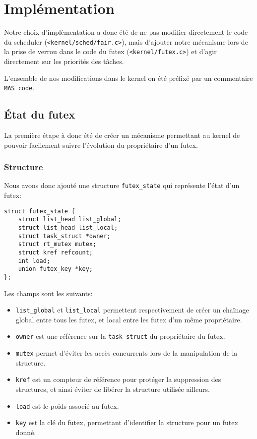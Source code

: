 \section{Implémentation}

Notre choix d'implémentation a donc été de ne pas modifier directement le code du scheduler (\verb|<kernel/sched/fair.c>|), mais d'ajouter notre mécanisme lors de la prise de
verrou dans le code
du futex (\verb|<kernel/futex.c>|) et d'agir directement sur les priorités des tâches.

L'ensemble de nos modifications dans le kernel on été préfixé par un commentaire \verb|MAS code|.

\subsection{État du futex}

La première étape à donc été de créer un mécanisme permettant au kernel de pouvoir facilement
suivre l'évolution du propriétaire d'un futex.

\subsubsection{Structure}

Nous avons donc ajouté une structure \verb|futex_state| qui représente l'état d'un
futex:

\begin{lstlisting}[tabsize=4]
struct futex_state {
	struct list_head list_global;
	struct list_head list_local;
	struct task_struct *owner;
	struct rt_mutex mutex;
	struct kref refcount;
	int load;
	union futex_key *key;
};
\end{lstlisting}

Les champs sont les suivants:
\begin{itemize}
	\item \verb|list_global| et \verb|list_local| permettent respectivement de
	créer un chaînage global entre tous les futex, et local entre les futex d'un même
	propriétaire.
	\item \verb|owner| est une référence sur la \verb|task_struct| du propriétaire du futex.
	
	\item \verb|mutex| permet d'éviter les accès concurrents lors de la manipulation de
	la structure.
	
	\item \verb|kref| est un compteur de référence pour protéger la suppression
	des structures, et ainsi éviter de libérer la structure utilisée ailleurs.
	
	\item \verb|load| est le poids associé au futex.
	
	\item \verb|key| est la clé du futex, permettant d'identifier la structure pour un 
	futex donné.
\end{itemize}
\hspace{1cm}

